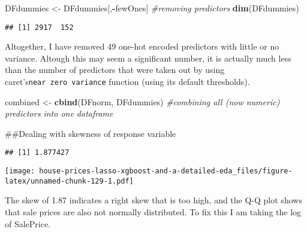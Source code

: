 \documentclass[]{article}
\newenvironment{Shaded}{\begin{snugshade}}{\end{snugshade}}
\newcommand{\CommentTok}[1]{\textcolor[rgb]{0.56,0.35,0.01}{\textit{#1}}}
\newcommand{\KeywordTok}[1]{\textcolor[rgb]{0.13,0.29,0.53}{\textbf{#1}}}
\newcommand{\NormalTok}[1]{#1}
\newcommand{\OperatorTok}[1]{\textcolor[rgb]{0.81,0.36,0.00}{\textbf{#1}}}
\newcommand{\StringTok}[1]{\textcolor[rgb]{0.31,0.60,0.02}{#1}}
\begin{document}
\begin{Shaded}
\begin{Highlighting}[]
\NormalTok{DFdummies <-}\StringTok{ }\NormalTok{DFdummies[,}\OperatorTok{-}\NormalTok{fewOnes] }\CommentTok{#removing predictors}
\KeywordTok{dim}\NormalTok{(DFdummies)}
\end{Highlighting}
\end{Shaded}

\begin{verbatim}
## [1] 2917  152
\end{verbatim}

Altogether, I have removed 49 one-hot encoded predictors with little or
no variance. Altough this may seem a significant number, it is actually
much less than the number of predictors that were taken out by using
caret's\texttt{near\ zero\ variance} function (using its default
thresholds).

\begin{Shaded}
\begin{Highlighting}[]
\NormalTok{combined <-}\StringTok{ }\KeywordTok{cbind}\NormalTok{(DFnorm, DFdummies) }\CommentTok{#combining all (now numeric) predictors into one dataframe }
\end{Highlighting}
\end{Shaded}

\#\#Dealing with skewness of response variable

\begin{Shaded}
\end{Shaded}

\begin{verbatim}
## [1] 1.877427
\end{verbatim}

\begin{Shaded}
\end{Shaded}

\texttt{[image: house-prices-lasso-xgboost-and-a-detailed-eda\_files/figure-latex/unnamed-chunk-129-1.pdf]}

The skew of 1.87 indicates a right skew that is too high, and the Q-Q
plot shows that sale prices are also not normally distributed. To fix
this I am taking the log of SalePrice.
\end{document}
